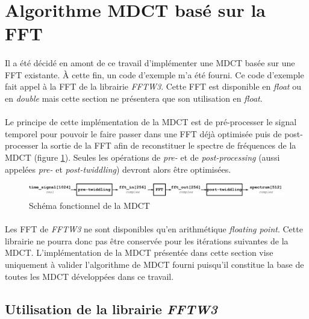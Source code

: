 \documentclass{article}
\begin{document}
    \newpage
    \section{Algorithme MDCT basé sur la FFT}

    \paragraph{}
    Il a été décidé en amont de ce travail d'implémenter une MDCT basée sur une FFT existante. À cette fin, un code d'exemple m'a été fourni\cite{dsprelated}. Ce code d'exemple fait appel à la FFT de la librairie \emph{FFTW3}. Cette FFT est disponible en \emph{float} ou en \emph{double} mais cette section ne présentera que son utilisation en \emph{float}.

    \paragraph{}
    Le principe de cette implémentation de la MDCT est de pré-processer le signal temporel pour pouvoir le faire passer dans une FFT déjà optimisée puis de post-processer la sortie de la FFT afin de reconstituer le spectre de fréquences de la MDCT (figure \ref{fig:schema-mdct}). Seules les opérations de \emph{pre-} et de \emph{post-processing} (aussi appelées \emph{pre-} et \emph{post-twiddling}) devront alors être optimisées.

    \begin{figure}[H]
        \centering
        \includegraphics[width=\linewidth]{./images/schema-mdct.pdf}
        \caption{Schéma fonctionnel de la MDCT}
        \label{fig:schema-mdct}
    \end{figure}

    \paragraph{}
    Les FFT de \emph{FFTW3} ne sont disponibles qu'en arithmétique \emph{floating point}. Cette librairie ne pourra donc pas être conservée pour les itérations suivantes de la MDCT. L'implémentation de la MDCT présentée dans cette section vise uniquement à valider l'algorithme de MDCT fourni puisqu'il constitue la base de toutes les MDCT développées dans ce travail.


    \subsection{Utilisation de la librairie \emph{FFTW3}}
\end{document}

